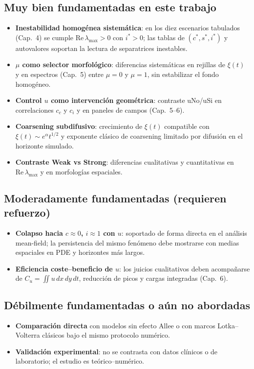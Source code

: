 \subsection*{Muy bien fundamentadas en este trabajo}
\begin{itemize}
  \item \textbf{Inestabilidad homogénea sistemática}: en los diez escenarios tabulados (Cap.~4) se cumple $\mathrm{Re}\,\lambda_{\max}>0$ con $i^*>0$; las tablas de $(c^*,s^*,i^*)$ y autovalores soportan la lectura de separatrices inestables.
  \item \textbf{$\mu$ como selector morfológico}: diferencias sistemáticas en rejillas de $\xi(t)$ y en espectros (Cap.~5) entre $\mu=0$ y $\mu=1$, sin estabilizar el fondo homogéneo.
  \item \textbf{Control $u$ como intervención geométrica}: contraste uNo/uSi en correlaciones $c_c$ y $c_i$ y en paneles de campos (Cap.~5--6).
  \item \textbf{Coarsening subdifusivo}: crecimiento de $\xi(t)$ compatible con $\xi(t)\sim e^{\alpha}t^{1/2}$ y exponente clásico de coarsening limitado por difusión \cite{bray1994} en el horizonte simulado.
  \item \textbf{Contraste Weak vs Strong}: diferencias cualitativas y cuantitativas en $\mathrm{Re}\,\lambda_{\max}$ y en morfologías espaciales.
\end{itemize}

\subsection*{Moderadamente fundamentadas (requieren refuerzo)}
\begin{itemize}
  \item \textbf{Colapso hacia $c\approx0$, $i\approx1$ con $u$}: soportado de forma directa en el análisis mean-field; la persistencia del mismo fenómeno debe mostrarse con medias espaciales en PDE y horizontes más largos.
  \item \textbf{Eficiencia coste--beneficio de $u$}: los juicios cualitativos deben acompañarse de $C_u=\iint u\,dx\,dy\,dt$, reducción de picos y cargas integradas (Cap.~6).
\end{itemize}

\subsection*{Débilmente fundamentadas o aún no abordadas}
\begin{itemize}
  \item \textbf{Comparación directa} con modelos sin efecto Allee o con marcos Lotka--Volterra clásicos bajo el mismo protocolo numérico.
  \item \textbf{Validación experimental}: no se contrasta con datos clínicos o de laboratorio; el estudio es teórico--numérico.
\end{itemize}

